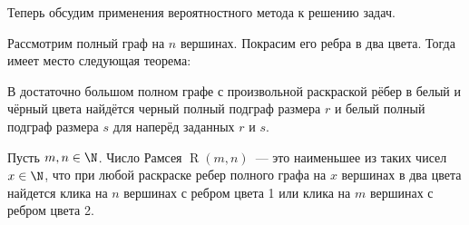 Теперь обсудим применения вероятностного метода к решению задач.

Рассмотрим полный граф на \(n\) вершинах. Покрасим его ребра в два цвета. Тогда имеет место следующая теорема:
\begin{theorem}[Рамсей]
    В достаточно большом полном графе с произвольной раскраской рёбер в белый и чёрный цвета найдётся черный полный подграф размера \(r\) и белый полный подграф размера \(s\) для наперёд заданных \(r\) и \(s\).
\end{theorem}

\begin{definition}
    Пусть \(m, n \in \N\). Число Рамсея \(\operatorname{R}(m, n)\)~--- это наименьшее из таких чисел \(x \in \N\), что при любой раскраске ребер полного графа на \(x\) вершинах в два цвета найдется клика на \(n\) вершинах с ребром цвета 1 или клика на \(m\) вершинах с ребром цвета 2.
\end{definition}

